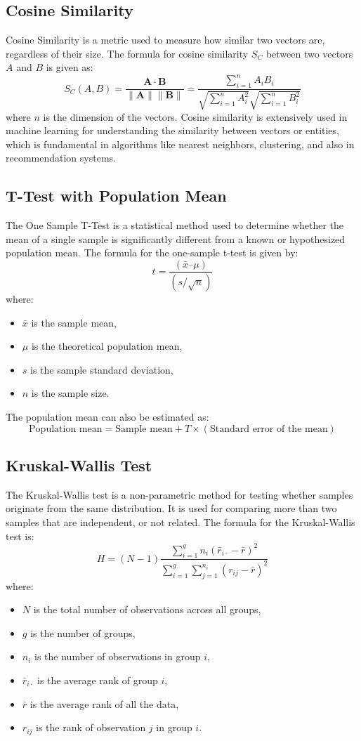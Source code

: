 \subsection*{Cosine Similarity}
Cosine Similarity is a metric used to measure how similar two vectors are, regardless of their size. The formula for cosine similarity \( S_C \) between two vectors \( A \) and \( B \) is given as:
\[ S_C(A,B) = \frac{{\mathbf{A} \cdot \mathbf{B}}}{{\|\mathbf{A}\|\|\mathbf{B}\|}} = \frac{{\sum_{i=1}^{n}{A_iB_i}}}{{\sqrt{\sum_{i=1}^{n}{A_i^2}}\sqrt{\sum_{i=1}^{n}{B_i^2}}}} \]
where \( n \) is the dimension of the vectors.
Cosine similarity is extensively used in machine learning for understanding the similarity between vectors or entities, which is fundamental in algorithms like nearest neighbors, clustering, and also in recommendation systems.

\subsection*{T-Test with Population Mean}
The One Sample T-Test is a statistical method used to determine whether the mean of a single sample is significantly different from a known or hypothesized population mean. The formula for the one-sample t-test is given by:
\[ t = \frac{( \bar{x} – \mu)}{(s / \sqrt{n})} \]
where:
\begin{itemize}
    \item \( \bar{x} \) is the sample mean,
    \item \( \mu \) is the theoretical population mean,
    \item \( s \) is the sample standard deviation,
    \item \( n \) is the sample size.
\end{itemize}
The population mean can also be estimated as:
\[ \text{Population mean} = \text{Sample mean} + T \times (\text{Standard error of the mean}) \]

\subsection*{Kruskal-Wallis Test}
The Kruskal-Wallis test is a non-parametric method for testing whether samples originate from the same distribution. It is used for comparing more than two samples that are independent, or not related. The formula for the Kruskal-Wallis test is:
\[ H = \left(N-1\right)\frac{\sum_{i=1}^g n_i(\bar{r}_{i\cdot} - \bar{r})^2}{\sum_{i=1}^g\sum_{j=1}^{n_i}(r_{ij} - \bar{r})^2} \]
where:
\begin{itemize}
    \item \( N \) is the total number of observations across all groups,
    \item \( g \) is the number of groups,
    \item \( n_{i} \) is the number of observations in group \( i \),
    \item \( \bar{r}_{i\cdot} \) is the average rank of group \( i \),
    \item \( \bar{r} \) is the average rank of all the data,
    \item \( r_{ij} \) is the rank of observation \( j \) in group \( i \).
\end{itemize}

